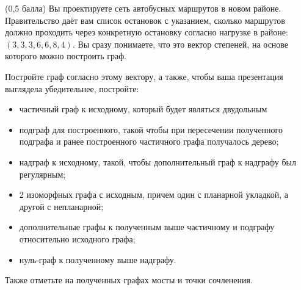 \question
(0,5 балла) Вы проектируете сеть автобусных маршрутов в новом районе. Правительство даёт вам список остановок с указанием, сколько маршрутов должно проходить через конкретную остановку согласно нагрузке в районе: $(3, 3, 3, 6, 6, 8, 4)$. Вы сразу понимаете, что это вектор степеней, на основе которого можно построить граф.

Постройте граф согласно этому вектору, а также, чтобы ваша презентация выглядела убедительнее, постройте:

\begin{itemize}
\item частичный граф к исходному, который будет являться двудольным
\item подграф для построенного, такой чтобы при пересечении полученного подграфа и ранее построенного частичного графа получалось дерево;
\item надграф к исходному, такой, чтобы дополнительный граф к надграфу был регулярным;
\item 2 изоморфных графа с исходным, причем один с планарной укладкой, а другой с непланарной;
\item дополнительные графы к полученным выше частичному и подграфу относительно исходного графа;
\item нуль-граф к полученному выше надграфу.
\end{itemize}

Также отметьте на полученных графах мосты и точки сочленения.
